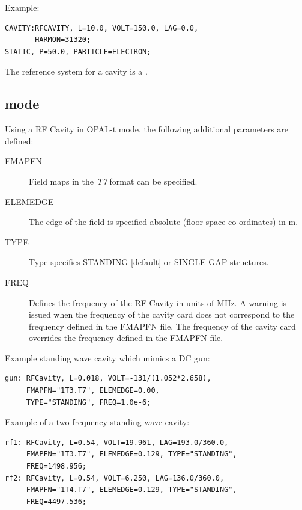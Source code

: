 \noindent Example:
\begin{verbatim}
CAVITY:RFCAVITY, L=10.0, VOLT=150.0, LAG=0.0, 
       HARMON=31320;
STATIC, P=50.0, PARTICLE=ELECTRON;
\end{verbatim}
The reference system for a cavity is a 
.

\subsection{\opalt mode}
\label{sec:cavity-t}
Using a RF Cavity in OPAL-t mode, the following additional parameters are defined:
\begin{description}
\item[FMAPFN]
  Field maps in the {\em T7} format can be specified.
\item[ELEMEDGE]
  The edge of the field is specified absolute (floor space co-ordinates) in m.
  \item[TYPE]
  Type specifies STANDING [default] or SINGLE GAP structures.   
  \item[FREQ]
  Defines the frequency of the RF Cavity in units of MHz. A warning is issued when the frequency of
  the cavity card does not correspond to the frequency defined in the   FMAPFN file. The  frequency of
  the cavity card overrides the  frequency defined in the  FMAPFN file.
  \end{description}
\noindent Example standing wave cavity which mimics a DC gun:
\begin{verbatim}
gun: RFCavity, L=0.018, VOLT=-131/(1.052*2.658), 
     FMAPFN="1T3.T7", ELEMEDGE=0.00, 
     TYPE="STANDING", FREQ=1.0e-6;
\end{verbatim}
\noindent Example of a two frequency standing wave cavity:
\begin{verbatim}
rf1: RFCavity, L=0.54, VOLT=19.961, LAG=193.0/360.0,
     FMAPFN="1T3.T7", ELEMEDGE=0.129, TYPE="STANDING", 
     FREQ=1498.956;
rf2: RFCavity, L=0.54, VOLT=6.250, LAG=136.0/360.0,
     FMAPFN="1T4.T7", ELEMEDGE=0.129, TYPE="STANDING", 
     FREQ=4497.536;
\end{verbatim}

